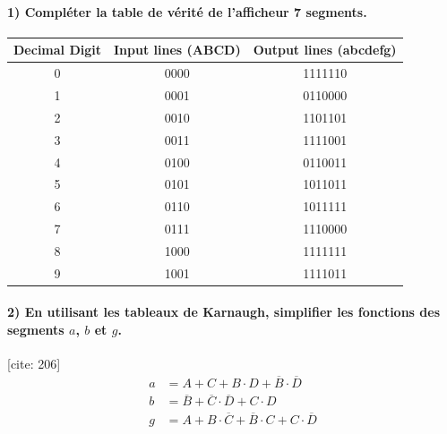 \documentclass[11pt,a4paper]{article}
\begin{document}
\paragraph{1) Compléter la table de vérité de l'afficheur 7 segments.}

\begin{table}[h!]
    \centering
    \begin{tabular}{ccc}
        \toprule
        \textbf{Decimal Digit} & \textbf{Input lines (ABCD)} & \textbf{Output lines (abcdefg)} \\
        \midrule
        0 & 0000 & 1111110 \\
        1 & 0001 & 0110000 \\
        2 & 0010 & 1101101 \\
        3 & 0011 & 1111001 \\
        4 & 0100 & 0110011 \\
        5 & 0101 & 1011011 \\
        6 & 0110 & 1011111 \\
        7 & 0111 & 1110000 \\
        8 & 1000 & 1111111 \\
        9 & 1001 & 1111011 \\
        \bottomrule
    \end{tabular}
\end{table}

\paragraph{2) En utilisant les tableaux de Karnaugh, simplifier les fonctions des segments $a$, $b$ et $g$.}
[cite: 206]
\begin{align*}
    a &= A + C + B\cdot D + \overline{B}\cdot\overline{D} \\
    b &= \overline{B} + \overline{C}\cdot\overline{D} + C\cdot D \\
    g &= A + B\cdot\overline{C} + \overline{B}\cdot C + C\cdot\overline{D}
\end{align*}
\end{document}
